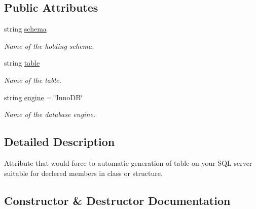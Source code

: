 \subsection*{Public Attributes}
\begin{DoxyCompactItemize}
\item 
string \mbox{\hyperlink{class_uniform_data_operator_1_1_sql_1_1_attributes_1_1_table_a8390d02fa5d0b96ffd6e8f40cafefb7d}{schema}}
\begin{DoxyCompactList}\small\item\em Name of the holding schema. \end{DoxyCompactList}\item 
string \mbox{\hyperlink{class_uniform_data_operator_1_1_sql_1_1_attributes_1_1_table_ab413ed3bf0c1b110cf4b05cdea966de5}{table}}
\begin{DoxyCompactList}\small\item\em Name of the table. \end{DoxyCompactList}\item 
string \mbox{\hyperlink{class_uniform_data_operator_1_1_sql_1_1_attributes_1_1_table_afe0c2479401391900b1b16055a090e07}{engine}} = \char`\"{}Inno\+DB\char`\"{}
\begin{DoxyCompactList}\small\item\em Name of the database engine. \end{DoxyCompactList}\end{DoxyCompactItemize}


\subsection{Detailed Description}
Attribute that would force to automatic generation of table on your S\+QL server suitable for declered members in class or structure. 



\subsection{Constructor \& Destructor Documentation}
\mbox{\label{class_uniform_data_operator_1_1_sql_1_1_attributes_1_1_table_ad56af3278ca73f930b84b9dcbe777d5d}} 
